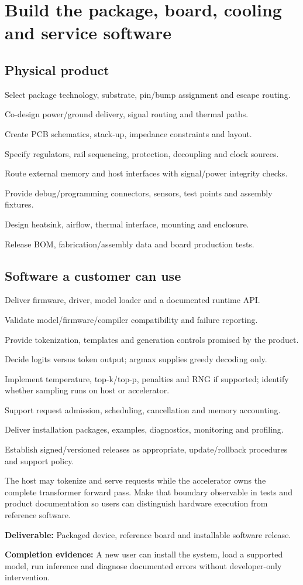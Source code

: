 \documentclass[11pt,a4paper]{article}
\newcommand{\phase}[2]{\clearpage\section{#1}\label{#2}}
\newcommand{\deliver}[2]{\begin{tcolorbox}[colback=pale,colframe=line,boxrule=0.5pt,arc=1mm,left=8pt,right=8pt,top=6pt,bottom=6pt]\textbf{Deliverable:} #1\par\textbf{Completion evidence:} #2\end{tcolorbox}}
\begin{document}
\phase{Build the package, board, cooling and service software}{sec:board}
\subsection*{Physical product}
\begin{checklist}
\item Select package technology, substrate, pin/bump assignment and escape routing.
\item Co-design power/ground delivery, signal routing and thermal paths.
\item Create PCB schematics, stack-up, impedance constraints and layout.
\item Specify regulators, rail sequencing, protection, decoupling and clock sources.
\item Route external memory and host interfaces with signal/power integrity checks.
\item Provide debug/programming connectors, sensors, test points and assembly fixtures.
\item Design heatsink, airflow, thermal interface, mounting and enclosure.
\item Release BOM, fabrication/assembly data and board production tests.
\end{checklist}
\subsection*{Software a customer can use}
\begin{checklist}
\item Deliver firmware, driver, model loader and a documented runtime API.
\item Validate model/firmware/compiler compatibility and failure reporting.
\item Provide tokenization, templates and generation controls promised by the product.
\item Decide logits versus token output; argmax supplies greedy decoding only.
\item Implement temperature, top-k/top-p, penalties and RNG if supported; identify
whether sampling runs on host or accelerator.
\item Support request admission, scheduling, cancellation and memory accounting.
\item Deliver installation packages, examples, diagnostics, monitoring and profiling.
\item Establish signed/versioned releases as appropriate, update/rollback procedures and support policy.
\end{checklist}
The host may tokenize and serve requests while the accelerator owns the complete
transformer forward pass. Make that boundary observable in tests and product
documentation so users can distinguish hardware execution from reference software.
\deliver{Packaged device, reference board and installable software release.}{A new
user can install the system, load a supported model, run inference and diagnose
documented errors without developer-only intervention.}
\end{document}
